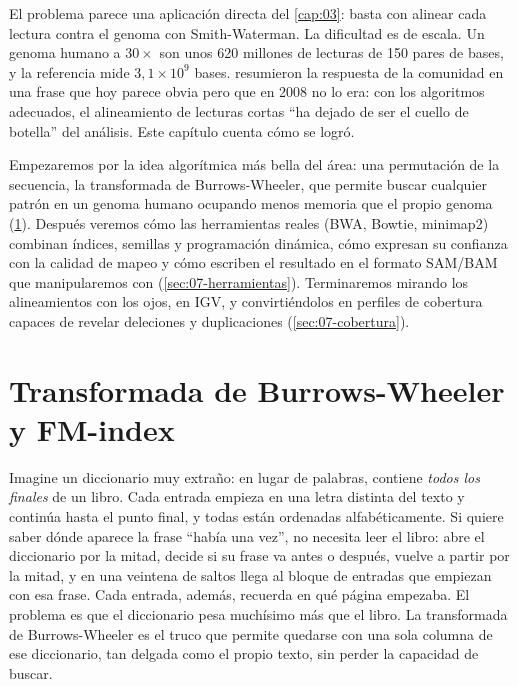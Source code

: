 El problema parece una aplicación directa del \cref{cap:03}: basta con alinear cada lectura contra el genoma con Smith-Waterman. La dificultad es de escala. Un genoma humano a $30\times$ son unos 620 millones de lecturas de 150 pares de bases, y la referencia mide $3{,}1\times10^{9}$ bases. \textcite{c07-lihomer2010} resumieron la respuesta de la comunidad en una frase que hoy parece obvia pero que en 2008 no lo era: con los algoritmos adecuados, el alineamiento de lecturas cortas ``ha dejado de ser el cuello de botella'' del análisis. Este capítulo cuenta cómo se logró.

Empezaremos por la idea algorítmica más bella del área: una permutación de la secuencia, la transformada de Burrows-Wheeler, que permite buscar cualquier patrón en un genoma humano ocupando menos memoria que el propio genoma (\cref{sec:07-bwt}). Después veremos cómo las herramientas reales (BWA, Bowtie, minimap2) combinan índices, semillas y programación dinámica, cómo expresan su confianza con la calidad de mapeo y cómo escriben el resultado en el formato SAM/BAM que manipularemos con  (\cref{sec:07-herramientas}). Terminaremos mirando los alineamientos con los ojos, en IGV, y convirtiéndolos en perfiles de cobertura capaces de revelar deleciones y duplicaciones (\cref{sec:07-cobertura}).

\section{Transformada de Burrows-Wheeler y FM-index}\label{sec:07-bwt}

\begin{intuicion}
Imagine un diccionario muy extraño: en lugar de palabras, contiene \emph{todos los finales} de un libro. Cada entrada empieza en una letra distinta del texto y continúa hasta el punto final, y todas están ordenadas alfabéticamente. Si quiere saber dónde aparece la frase ``había una vez'', no necesita leer el libro: abre el diccionario por la mitad, decide si su frase va antes o después, vuelve a partir por la mitad, y en una veintena de saltos llega al bloque de entradas que empiezan con esa frase. Cada entrada, además, recuerda en qué página empezaba. El problema es que el diccionario pesa muchísimo más que el libro. La transformada de Burrows-Wheeler es el truco que permite quedarse con una sola columna de ese diccionario, tan delgada como el propio texto, sin perder la capacidad de buscar.
\end{intuicion}

